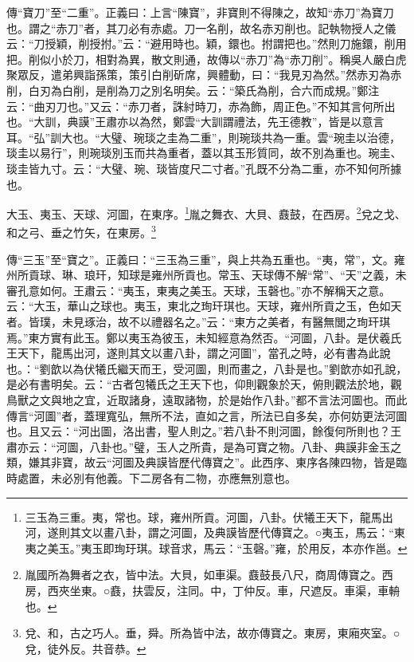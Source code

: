 {\noindent\zhuan{}\fzbyks 傳“寶刀”至“二重”。正義曰：上言“陳寶”，非寶則不得陳之，故知“赤刀”為寶刀也。謂之“赤刀”者，其刀必有赤處。刀一名削，故名赤刃削也。記執物授人之儀云：“刀授穎，削授拊。”云：“避用時也。穎，鐶也。拊謂把也。”然則刀施鐶，削用把。削似小於刀，相對為異，散文則通，故傳以“赤刀”為“赤刀削”。稱吳人嚴白虎聚眾反，遣弟興詣孫策，策引白削斫席，興體動，曰：“我見刃為然。”然赤刃為赤削，白刃為白削，是削為刀之別名明矣。云：“築氏為削，合六而成規。”鄭注云：“曲刃刀也。”又云：“赤刀者，誅紂時刀，赤為飾，周正色。”不知其言何所出也。“大訓，典謨”王肅亦以為然，鄭雲“大訓謂禮法，先王德教”，皆是以意言耳。“弘”訓大也。“大璧、琬琰之圭為二重”，則琬琰共為一重。雲“琬圭以治德，琰圭以易行”，則琬琰別玉而共為重者，蓋以其玉形質同，故不別為重也。琬圭、琰圭皆九寸。云：“大璧、琬、琰皆度尺二寸者。”孔既不分為二重，亦不知何所據也。 \par}

大玉、夷玉、天球、河圖，在東序。\footnote{三玉為三重。夷，常也。球，雍州所貢。河圖，八卦。伏犧王天下，龍馬出河，遂則其文以畫八卦，謂之河圖，及典謨皆歷代傳寶之。○夷玉，馬云：“東夷之美玉。”夷玉即珣玗琪。球音求，馬云：“玉磬。”雍，於用反，本亦作邕。}胤之舞衣、大貝、鼖鼓，在西房。\footnote{胤國所為舞者之衣，皆中法。大貝，如車渠。鼖鼓長八尺，商周傳寶之。西房，西夾坐東。○鼖，扶雲反，注同。中，丁仲反。車，尺遮反。車渠，車輈也。}兌之戈、和之弓、垂之竹矢，在東房。\footnote{兌、和，古之巧人。垂，舜。所為皆中法，故亦傳寶之。東房，東廂夾室。○兌，徒外反。共音恭。}


{\noindent\zhuan{}\fzbyks 傳“三玉”至“寶之”。正義曰：“三玉為三重”，與上共為五重也。“夷，常”，文。雍州所貢球、琳、琅玕，知球是雍州所貢也。常玉、天球傳不解“常”、“天”之義，未審孔意如何。王肅云：“夷玉，東夷之美玉。天球，玉磬也。”亦不解稱天之意。云：“大玉，華山之球也。夷玉，東北之珣玕琪也。天球，雍州所貢之玉，色如天者。皆璞，未見琢治，故不以禮器名之。”云：“東方之美者，有醫無閭之珣玕琪焉。”東方實有此玉。鄭以夷玉為彼玉，未知經意為然否。“河圖，八卦。是伏羲氏王天下，龍馬出河，遂則其文以畫八卦，謂之河圖”，當孔之時，必有書為此說也。：“劉歆以為伏犧氏繼天而王，受河圖，則而畫之，八卦是也。”劉歆亦如孔說，是必有書明矣。云：“古者包犧氏之王天下也，仰則觀象於天，俯則觀法於地，觀鳥獸之文與地之宜，近取諸身，遠取諸物，於是始作八卦。”都不言法河圖也。而此傳言“河圖”者，蓋理寬弘，無所不法，直如之言，所法已自多矣，亦何妨更法河圖也。且又云：“河出圖，洛出書，聖人則之。”若八卦不則河圖，餘復何所則也？王肅亦云：“河圖，八卦也。”璧，玉人之所貴，是為可寶之物。八卦、典謨非金玉之類，嫌其非寶，故云“河圖及典謨皆歷代傳寶之”。此西序、東序各陳四物，皆是臨時處置，未必別有他義。下二房各有二物，亦應無別意也。 \par}

